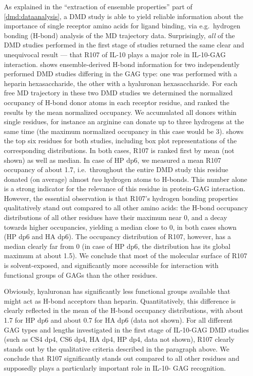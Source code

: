 As explained in the \enquote{extraction of ensemble properties} part of
\cref{dmd:dataanalysis}, a DMD study is able to yield reliable information
about the importance of single receptor amino acids for ligand binding, via
e.g.\ hydrogen bonding (H-bond) analysis of the MD trajectory data.
Surprisingly, \textit{all} of the DMD studies performed in the first stage of
studies returned the same clear and unequivocal result --- that R107 of IL-10
plays a major role in IL-10-GAG interaction.
 shows ensemble-derived H-bond
information for two independently performed DMD studies differing in the GAG
type: one was performed with a heparin hexasaccharide, the other with a
hyaluronan hexasaccharide. For each free MD trajectory in these two DMD studies
we determined the normalized occupancy of H-bond donor atoms in each receptor
residue, and ranked the results by the mean normalized occupancy. We accumulated
all donors within single residues, for instance an arginine can donate up to
three hydrogens at the same time (the maximum normalized occupancy in this case
would be 3).  shows the top six
residues for both studies, including box plot representations of the
corresponding distributions. In both cases, R107 is ranked first by mean (not
shown) as well as median. In case of HP dp6, we measured a mean R107 occupancy
of about 1.7, i.e.\ throughout the entire DMD study this residue donated (on
average) almost \textit{two} hydrogen atoms to H-bonds. This number alone is a
strong indicator for the relevance of this residue in protein-GAG interaction.
However, the essential observation is that R107's hydrogen bonding properties
qualitatively stand out compared to all other amino acids: the H-bond occupancy
distributions of all other residues have their maximum near 0, and a decay
towards higher occupancies, yielding a median close to 0, in both cases shown
(HP dp6 and HA dp6). The occupancy distribution of R107, however, has a median
clearly far from 0 (in case of HP dp6, the distribution has its global maximum
at about 1.5). We conclude that most of the molecular surface of R107 is
solvent-exposed, and significantly more accessible for interaction with
functional groups of GAGs than the other residues.

Obviously, hyaluronan has significantly less functional groups available that
might act as H-bond acceptors than heparin. Quantitatively, this difference is
clearly reflected in the mean of the H-bond occupancy distributions, with about
1.7 for HP dp6 and about 0.7 for HA dp6 (data not shown). For all different GAG
types and lengths investigated in the first stage of IL-10-GAG DMD studies (such
as CS4 dp4, CS6 dp4, HA dp4, HP dp4, data not shown), R107 clearly stands out by
the qualitative criteria described in the paragraph above. We conclude that R107
significantly stands out compared to all other residues and supposedly plays a
particularly important role in IL-10- GAG recognition.



